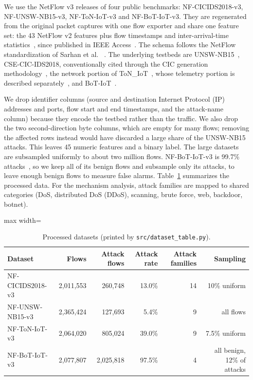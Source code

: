 \documentclass[11pt]{article}
\begin{document}
We use the NetFlow v3 releases of four public benchmarks: NF-CICIDS2018-v3, NF-UNSW-NB15-v3, NF-ToN-IoT-v3 and NF-BoT-IoT-v3. They are regenerated from the original packet captures with one flow exporter and share one feature set: the 43 NetFlow v2 features plus flow timestamps and inter-arrival-time statistics~\cite{luay2025temporal}, since published in IEEE Access~\cite{luay2026timematters}. The schema follows the NetFlow standardization of Sarhan et al. ~\cite{sarhan2021netflow,sarhan2022standard}. The underlying testbeds are UNSW-NB15~\cite{moustafa2015unsw}, CSE-CIC-IDS2018, conventionally cited through the CIC generation methodology~\cite{sharafaldin2018toward}, the network portion of ToN\_IoT~\cite{moustafa2021tonnetwork}, whose telemetry portion is described separately~\cite{alsaedi2020ton}, and BoT-IoT~\cite{koroniotis2019bot}.

We drop identifier columns (source and destination Internet Protocol (IP) addresses and ports, flow start and end timestamps, and the attack-name column) because they encode the testbed rather than the traffic. We also drop the two second-direction byte columns, which are empty for many flows; removing the affected rows instead would have discarded a large share of the UNSW-NB15 attacks. This leaves 45 numeric features and a binary label. The large datasets are subsampled uniformly to about two million flows. NF-BoT-IoT-v3 is 99.7\% attacks~\cite{luay2025temporal}, so we keep all of its benign flows and subsample only its attacks, to leave enough benign flows to measure false alarms. Table~\ref{tab:1} summarizes the processed data. For the mechanism analysis, attack families are mapped to shared categories (DoS, distributed DoS (DDoS), scanning, brute force, web, backdoor, botnet).

\begin{table}[t]
\centering
\small
\caption{Processed datasets (printed by \texttt{src/dataset\_table.py}).}
\label{tab:1}
\begin{adjustbox}{max width=\linewidth}
\begin{tabular}{lrrrrr}
\toprule
Dataset & Flows & Attack flows & Attack rate & Attack families & Sampling \\
\midrule
NF-CICIDS2018-v3 & 2,011,553 & 260,748 & 13.0\% & 14 & 10\% uniform \\
NF-UNSW-NB15-v3 & 2,365,424 & 127,693 & 5.4\% & 9 & all flows \\
NF-ToN-IoT-v3 & 2,064,020 & 805,024 & 39.0\% & 9 & 7.5\% uniform \\
NF-BoT-IoT-v3 & 2,077,807 & 2,025,818 & 97.5\% & 4 & all benign, 12\% of attacks \\
\bottomrule
\end{tabular}
\end{adjustbox}
\end{table}
\end{document}
